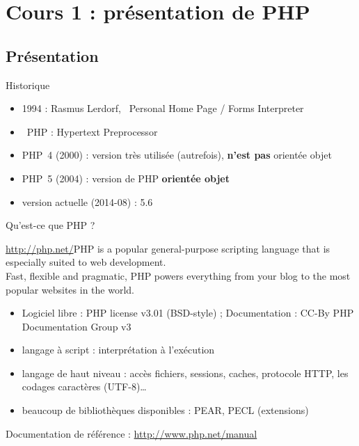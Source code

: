 
\section{Cours \textnumero{}1 : présentation de PHP}

\subsection{Présentation}

\begin{frame}{Historique}
    \begin{itemize}
	    \item 1994 : Rasmus Lerdorf, \og~Personal Home Page / Forms Interpreter~\fg
    	\item \og~PHP : Hypertext Preprocessor~\fg 
    	\item PHP~4 (2000) : version très utilisée (autrefois), \textbf{n’est pas} orientée objet
    	\item PHP~5 (2004) : version de PHP \textbf{orientée objet}
    	\item version actuelle (2014-08) : 5.6
    \end{itemize}
\end{frame}

\begin{frame}{Qu'est-ce que PHP ?}
    \begin{block}{\url{http://php.net/}}PHP is a popular general-purpose scripting language that is especially suited to web development.\\Fast, flexible and pragmatic, PHP powers everything from your blog to the most popular websites in the world.
    \end{block}
    \begin{itemize}
        \item Logiciel libre : PHP license v3.01 (BSD-style) ; Documentation : CC-By PHP Documentation Group v3
        \item langage à script : interprétation à l’exécution
        \item langage de haut niveau : accès fichiers, sessions, caches, protocole HTTP, les codages caractères (UTF-8)\ldots
        \item beaucoup de bibliothèques disponibles : PEAR, PECL (extensions)
    \end{itemize}
    Documentation de référence : \url{http://www.php.net/manual}
\end{frame}

